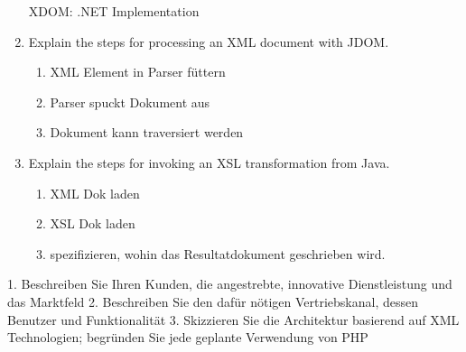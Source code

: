 \begin{enumerate}
XDOM: .NET Implementation
\item Explain the steps for processing an XML document with JDOM.\\
\begin{enumerate}
\item XML Element in Parser füttern
\item Parser spuckt Dokument aus
\item Dokument kann traversiert werden
\end{enumerate}
\item Explain the steps for invoking an XSL transformation from Java.\\
\begin{enumerate}
\item XML Dok laden
\item XSL Dok laden
\item spezifizieren, wohin das Resultatdokument geschrieben wird.
\end{enumerate}
\end{enumerate}

1. Beschreiben Sie Ihren Kunden, die angestrebte, innovative Dienstleistung und das Marktfeld
2. Beschreiben Sie den dafür nötigen Vertriebskanal, dessen Benutzer und Funktionalität
3. Skizzieren Sie die Architektur basierend auf XML Technologien; begründen Sie jede geplante Verwendung von PHP
